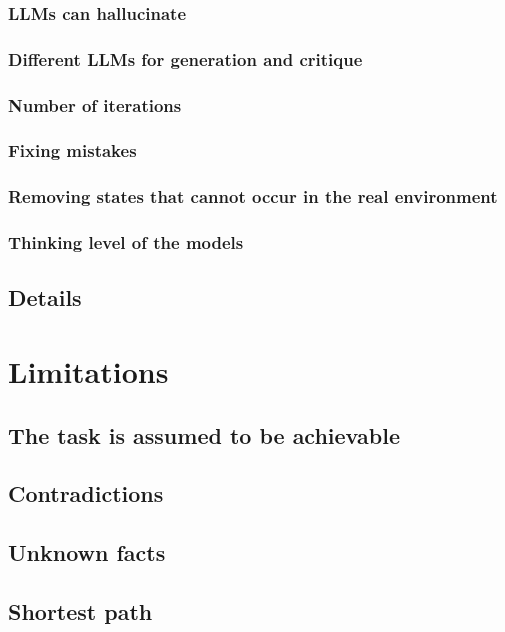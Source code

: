 \documentclass[11pt,english,listoffigures,listoftables, listofalgorithms]{tfgetsinf}
\begin{document}
\subsection{LLMs can hallucinate}
\subsection{Different LLMs for generation and critique}
\subsection{Number of iterations}
\subsection{Fixing mistakes}
\subsection{Removing states that cannot occur in the real environment}
\subsection{Thinking level of the models}
\section{Details}


\chapter{Limitations}
\label{chap:limitations}
\section{The task is assumed to be achievable}
\section{Contradictions}
\section{Unknown facts}
\section{Shortest path}
\end{document}
